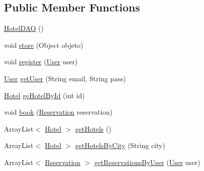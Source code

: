 \subsection*{Public Member Functions}
\begin{DoxyCompactItemize}
\item 
\mbox{\hyperlink{classbspq18__e4_1_1_gestion_hotelera_1_1server_1_1dao_1_1_hotel_d_a_o_a6da15770562483a6efda9e5226637bc2}{Hotel\+D\+AO}} ()
\item 
void \mbox{\hyperlink{classbspq18__e4_1_1_gestion_hotelera_1_1server_1_1dao_1_1_hotel_d_a_o_a85ecdd997c17390a28b8132f15ad431c}{store}} (Object objeto)
\item 
void \mbox{\hyperlink{classbspq18__e4_1_1_gestion_hotelera_1_1server_1_1dao_1_1_hotel_d_a_o_ac86f3620a6def683599bbbd8d479ac5c}{register}} (\mbox{\hyperlink{classbspq18__e4_1_1_gestion_hotelera_1_1server_1_1data_1_1_user}{User}} user)
\item 
\mbox{\hyperlink{classbspq18__e4_1_1_gestion_hotelera_1_1server_1_1data_1_1_user}{User}} \mbox{\hyperlink{classbspq18__e4_1_1_gestion_hotelera_1_1server_1_1dao_1_1_hotel_d_a_o_a0b26b5999cd9192cba1d5c1381f896e3}{get\+User}} (String email, String pass)
\item 
\mbox{\hyperlink{classbspq18__e4_1_1_gestion_hotelera_1_1server_1_1data_1_1_hotel}{Hotel}} \mbox{\hyperlink{classbspq18__e4_1_1_gestion_hotelera_1_1server_1_1dao_1_1_hotel_d_a_o_abde425c05091990ef43bab92ce179b9a}{ge\+Hotel\+By\+Id}} (int id)
\item 
void \mbox{\hyperlink{classbspq18__e4_1_1_gestion_hotelera_1_1server_1_1dao_1_1_hotel_d_a_o_a55ce977779b971f26efac36133dcbce0}{book}} (\mbox{\hyperlink{classbspq18__e4_1_1_gestion_hotelera_1_1server_1_1data_1_1_reservation}{Reservation}} reservation)
\item 
Array\+List$<$ \mbox{\hyperlink{classbspq18__e4_1_1_gestion_hotelera_1_1server_1_1data_1_1_hotel}{Hotel}} $>$ \mbox{\hyperlink{classbspq18__e4_1_1_gestion_hotelera_1_1server_1_1dao_1_1_hotel_d_a_o_a4dd881c70a7ac298606f02bfc5824422}{get\+Hotels}} ()
\item 
Array\+List$<$ \mbox{\hyperlink{classbspq18__e4_1_1_gestion_hotelera_1_1server_1_1data_1_1_hotel}{Hotel}} $>$ \mbox{\hyperlink{classbspq18__e4_1_1_gestion_hotelera_1_1server_1_1dao_1_1_hotel_d_a_o_ac0c16e945bf5f4a23bf1a68704d5252b}{get\+Hotels\+By\+City}} (String city)
\item 
Array\+List$<$ \mbox{\hyperlink{classbspq18__e4_1_1_gestion_hotelera_1_1server_1_1data_1_1_reservation}{Reservation}} $>$ \mbox{\hyperlink{classbspq18__e4_1_1_gestion_hotelera_1_1server_1_1dao_1_1_hotel_d_a_o_a9f7f21df7f6f48a54c6762d887741892}{get\+Reservations\+By\+User}} (\mbox{\hyperlink{classbspq18__e4_1_1_gestion_hotelera_1_1server_1_1data_1_1_user}{User}} user)

\end{DoxyCompactItemize}
